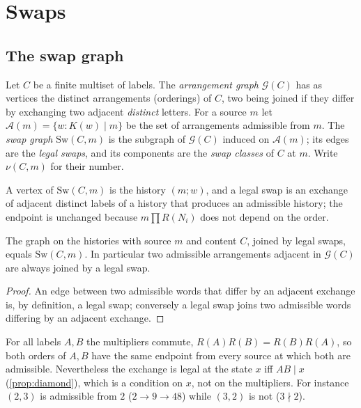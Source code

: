 \section{Swaps}\label{sec:swaps}
\subsection{The swap graph}
\begin{definition}\label{def:swapgraph}
Let $C$ be a finite multiset of labels. The \emph{arrangement graph} $\mathcal G(C)$ has as vertices the distinct arrangements (orderings) of $C$, two being joined if they differ by exchanging two adjacent \emph{distinct} letters. For a source $m$ let $\mathcal A(m)=\{w:K(w)\mid m\}$ be the set of arrangements admissible from $m$. The \emph{swap graph} $\mathrm{Sw}(C,m)$ is the subgraph of $\mathcal G(C)$ induced on $\mathcal A(m)$; its edges are the \emph{legal swaps}, and its components are the \emph{swap classes} of $C$ at $m$. Write $\nu(C,m)$ for their number.
\end{definition}
A vertex of $\mathrm{Sw}(C,m)$ is the history $(m;w)$, and a legal swap is an exchange of adjacent distinct labels of a history that produces an admissible history; the endpoint is unchanged because $m\prod R(N_i)$ does not depend on the order.
\begin{proposition}\label{prop:induced}
The graph on the histories with source $m$ and content $C$, joined by legal swaps, equals $\mathrm{Sw}(C,m)$. In particular two admissible arrangements adjacent in $\mathcal G(C)$ are always joined by a legal swap.
\end{proposition}
\begin{proof}
An edge between two admissible words that differ by an adjacent exchange is, by definition, a legal swap; conversely a legal swap joins two admissible words differing by an adjacent exchange.
\end{proof}
\begin{proposition}\label{prop:numcomm}
For all labels $A,B$ the multipliers commute, $R(A)R(B)=R(B)R(A)$, so both orders of $A,B$ have the same endpoint from every source at which both are admissible. Nevertheless the exchange is legal at the state $x$ iff $AB\mid x$ (\cref{prop:diamond}), which is a condition on $x$, not on the multipliers. For instance $(2,3)$ is admissible from $2$ ($2\to9\to48$) while $(3,2)$ is not ($3\nmid2$).
\end{proposition}
